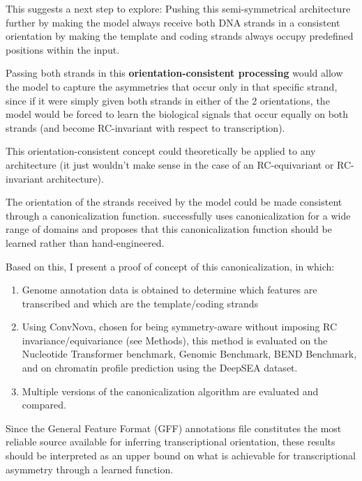 \documentclass[   ]{article}
\begin{document}
This suggests a next step to explore: Pushing this semi-symmetrical architecture further by making the model always receive both DNA strands in a consistent orientation by making the template and coding strands always occupy predefined positions within the input.

Passing both strands in this \textbf{orientation-consistent processing} would
allow the model to capture the asymmetries that occur only in that
specific strand, since if it were simply given both strands in either of
the 2 orientations, the model would be forced to learn the biological
signals that occur equally on both strands (and become RC-invariant with
respect to transcription).

This orientation-consistent concept could theoretically be applied to any architecture (it just wouldn't make sense in the case of an RC-equivariant or RC-invariant architecture).

The orientation of the strands received by the model could be made
consistent through a canonicalization function. \citet{kabaEquivarianceLearnedCanonicalization2023} successfully
uses canonicalization for a wide range of domains and proposes that
this canonicalization function should be learned rather than hand-engineered.

Based on this, I present a proof of concept of this canonicalization, in which:
\begin{enumerate}
	\item Genome annotation data is obtained to determine which features are transcribed and which are the template/coding strands
	\item Using ConvNova, chosen for being symmetry-aware without imposing RC invariance/equivariance (see Methods), this method is evaluated on the Nucleotide Transformer benchmark\citep{dalla-torreNucleotideTransformerBuilding2025}, Genomic Benchmark\citep{gresovaGenomicBenchmarksCollection2023}, BEND Benchmark\citep{marinBENDBenchmarkingDNA2023}, and on chromatin profile prediction using the DeepSEA dataset\citep{zhouPredictingEffectsNoncoding2015}.
	\item Multiple versions of the canonicalization algorithm are evaluated and compared.
\end{enumerate}

Since the General Feature Format (GFF) annotations file constitutes the most reliable source available for
inferring transcriptional orientation, these results should be
interpreted as an upper bound on what is achievable for transcriptional
asymmetry through a learned function. 
\end{document}
